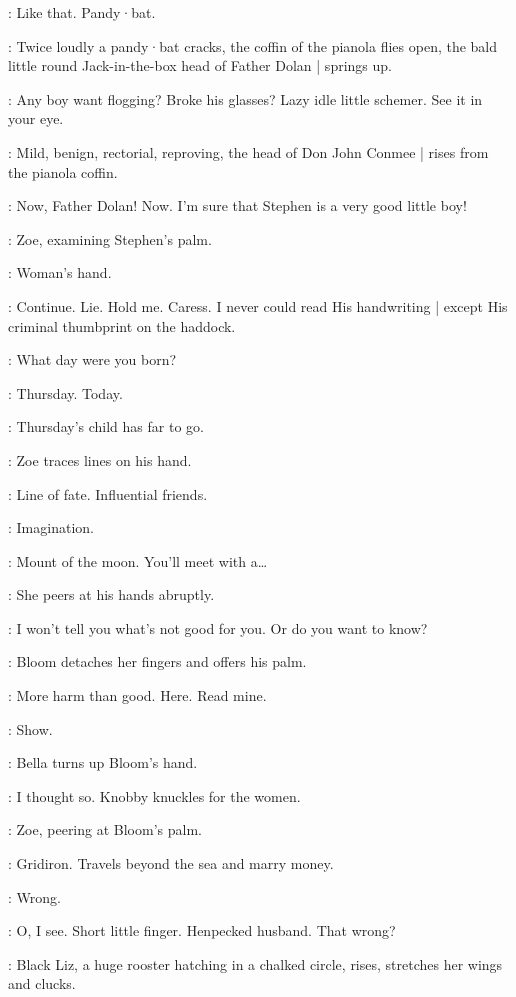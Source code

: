 \Lynch:
Like that.
Pandy·bat.

:
Twice loudly a pandy·bat cracks,
the coffin of the pianola flies open,
the bald little round Jack-in-the-box head of Father Dolan |
springs up.

\FatherDolan:
Any boy want flogging?
Broke his glasses?
Lazy idle little schemer.
See it in your eye.

:
Mild,
benign,
rectorial,
reproving,
the head of Don John Conmee |
rises from the pianola coffin.

\DonJohnConmee:
Now,
Father Dolan!
Now.
I'm sure that Stephen is a very good little boy!

:
Zoe,
examining Stephen's palm.

\Zoe:
Woman's hand.

\Stephen:
Continue.
Lie.
Hold me.
Caress.
I never could read His handwriting |
except His criminal thumbprint on the haddock.

\Zoe:
What day were you born?

\Stephen:
Thursday.
Today.

\Zoe:
Thursday's child has far to go.

:
Zoe traces lines on his hand.

\Zoe:
Line of fate.
Influential friends.

\Florry:
Imagination.

\Zoe:
Mount of the moon.
You'll meet with a…

:
She peers at his hands abruptly.

\Zoe:
I won't tell you what's not good for you.
Or do you want to know?

:
Bloom detaches her fingers and offers his palm.

\Bloom:
More harm than good.
Here.
Read mine.

\Bella:
Show.

:
Bella turns up Bloom's hand.

\Bella:
I thought so.
Knobby knuckles for the women.

:
Zoe,
peering at Bloom's palm.

\Zoe:
Gridiron.
Travels beyond the sea and marry money.

\Bloom:
Wrong.

\Zoe:
O,
I see.
Short little finger.
Henpecked husband.
That wrong?

:
Black Liz,
a huge rooster hatching in a chalked circle,
rises,
stretches her wings and clucks.

